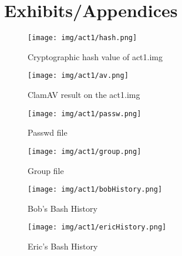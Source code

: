 \documentclass[a4paper,12pt]{article}
\begin{document}
\section{Exhibits/Appendices}



\begin{figure}[H]
	\begin{center}
		\texttt{[image: img/act1/hash.png]} 
	\end{center}
	\caption{Cryptographic hash value of act1.img}
	\label{hash}
\end{figure}

\begin{figure}[H]
	\begin{center}
		\texttt{[image: img/act1/av.png]} 
	\end{center}
	\caption{ClamAV result on the act1.img}
	\label{av}
\end{figure}

\begin{figure}[H]
	\begin{center}
		\texttt{[image: img/act1/passw.png]} 
	\end{center}
	\caption{Passwd file}
	\label{passwd}
\end{figure}

\begin{figure}[H]
	\begin{center}
		\texttt{[image: img/act1/group.png]} 
	\end{center}
	\caption{Group file}
	\label{group}
\end{figure}

\begin{figure}[H]
	\begin{center}
		\texttt{[image: img/act1/bobHistory.png]} 
	\end{center}
	\caption{Bob's Bash History}
	\label{bobBash}
\end{figure}


	
\begin{figure}[H]
	\begin{center}
		\texttt{[image: img/act1/ericHistory.png]} 
	\end{center}
	\caption{Eric's Bash History}
	\label{ericBash}
\end{figure}
\end{document}
